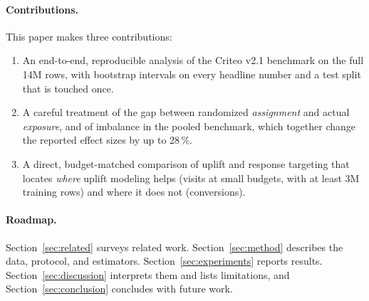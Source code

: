 \paragraph{Contributions.} This paper makes three contributions:
\begin{enumerate}
  \item An end-to-end, reproducible analysis of the Criteo v2.1 benchmark on
        the full 14M rows, with bootstrap intervals on every headline number
        and a test split that is touched once.
  \item A careful treatment of the gap between randomized \emph{assignment}
        and actual \emph{exposure}, and of imbalance in the pooled
        benchmark, which together change the reported effect sizes by up to
        28\,\%.
  \item A direct, budget-matched comparison of uplift and response targeting
        that locates \emph{where} uplift modeling helps (visits at small
        budgets, with at least 3M training rows) and where it does not
        (conversions).
\end{enumerate}

\paragraph{Roadmap.} Section~\ref{sec:related} surveys related work.
Section~\ref{sec:method} describes the data, protocol, and estimators.
Section~\ref{sec:experiments} reports results. Section~\ref{sec:discussion}
interprets them and lists limitations, and Section~\ref{sec:conclusion}
concludes with future work.
